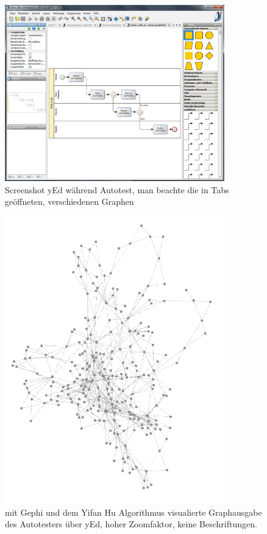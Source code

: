 \begin{figure}
	\centering
	\includegraphics[width=0.85\textwidth]{bilder/screenshot_yed.png}
	\caption{Screenshot yEd während Autotest, man beachte die in Tabs geöffneten, 
	verschiedenen Graphen}
	\label{fig:screenshot_yed}
\end{figure}

\begin{figure}
	\centering
	\includegraphics[width=0.85\textwidth]{bilder/model_yed_notext_yh.png}
	\caption{mit Gephi und dem Yifan Hu Algorithmus\cite{hu2005efficient}
    visualierte Graphausgabe des Autotesters über yEd, hoher Zoomfaktor, keine Beschriftungen.}
	\label{fig:screenshot_yed_yh}
\end{figure}

